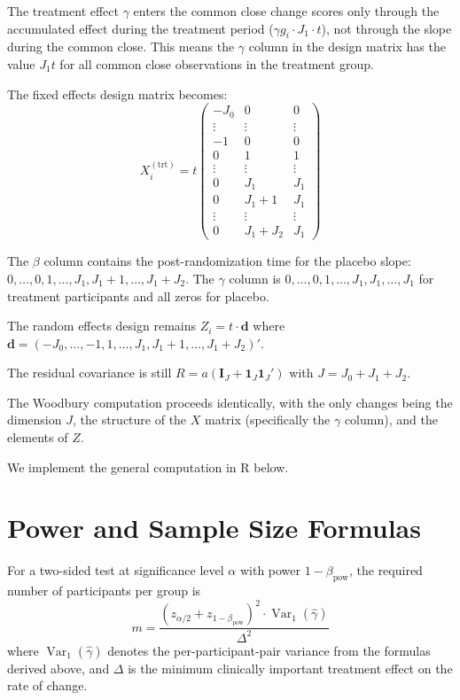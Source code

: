 \documentclass[
  11pt,
]{article}
\begin{document}
The treatment effect \(\gamma\) enters the common close change scores
only through the accumulated effect during the treatment period
(\(\gamma g_i \cdot J_1 \cdot t\)), not through the slope during the
common close. This means the \(\gamma\) column in the design matrix has
the value \(J_1 t\) for all common close observations in the treatment
group.

The fixed effects design matrix becomes: \[
  X_i^{(\text{trt})} = t\begin{pmatrix}
    -J_0   & 0 & 0 \\
    \vdots & \vdots & \vdots \\
    -1   & 0 & 0 \\
    0    & 1 & 1 \\
    \vdots & \vdots & \vdots \\
    0    & J_1 & J_1 \\
    0    & J_1+1 & J_1 \\
    \vdots & \vdots & \vdots \\
    0    & J_1+J_2 & J_1
  \end{pmatrix}
\]

The \(\beta\) column contains the post-randomization time for the
placebo slope: \(0,\ldots,0,1,\ldots,J_1,J_1+1,\ldots,J_1+J_2\). The
\(\gamma\) column is \(0,\ldots,0,1,\ldots,J_1,J_1,\ldots,J_1\) for
treatment participants and all zeros for placebo.

The random effects design remains \(Z_i = t \cdot \mathbf{d}\) where
\(\mathbf{d} = (-J_0,\ldots,-1,1,\ldots,J_1,J_1+1,\ldots,J_1+J_2)'\).

The residual covariance is still
\(R = a(\mathbf{I}_J + \mathbf{1}_J\mathbf{1}_J')\) with
\(J = J_0 + J_1 + J_2\).

The Woodbury computation proceeds identically, with the only changes
being the dimension \(J\), the structure of the \(X\) matrix
(specifically the \(\gamma\) column), and the elements of \(Z\).

We implement the general computation in R below.

\section{Power and Sample Size
Formulas}\label{power-and-sample-size-formulas}

For a two-sided test at significance level \(\alpha\) with power
\(1-\beta_{\text{pow}}\), the required number of participants per group
is \begin{equation}
  m = \frac{(z_{\alpha/2} + z_{1-\beta_{\text{pow}}})^2
    \cdot \mathop{\mathrm{Var}}_1(\hat{\gamma})}{\Delta^2}
  \label{eq:sample_size}
\end{equation} where \(\mathop{\mathrm{Var}}_1(\hat{\gamma})\) denotes
the per-participant-pair variance from the formulas derived above, and
\(\Delta\) is the minimum clinically important treatment effect on the
rate of change.
\end{document}
